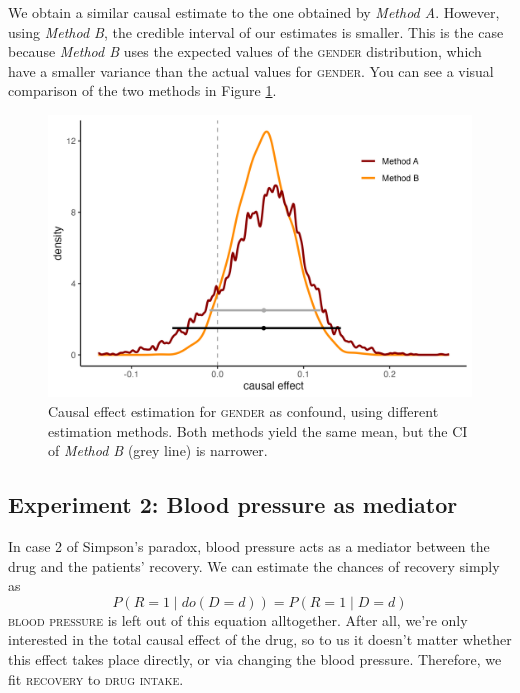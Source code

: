 \documentclass[nobib]{tufte-handout}
\newcommand{\mathdo}{\mathit{do}}
\begin{document}
We obtain a similar causal estimate to the one obtained by \emph{Method A}.
However, using \emph{Method B}, the credible interval of our estimates is smaller.
This is the case because \emph{Method B} uses the expected values of the \textsc{gender} distribution, which have a smaller variance than the actual values for \textsc{gender}.
You can see a visual comparison of the two methods in Figure \ref{fig:gender}.
\begin{figure}
    \centering
    \includegraphics[width=0.8\linewidth]{img/gender_estimation_comparison.png}
    \caption{Causal effect estimation for \textsc{gender} as confound, using different estimation methods. Both methods yield the same mean, but the CI of \emph{Method B} (grey line) is narrower.}
    \label{fig:gender}
\end{figure}


\subsection{Experiment 2: Blood pressure as mediator}
In case 2 of Simpson’s paradox, blood pressure acts as a mediator between the drug and the patients’ recovery. 
We can estimate the chances of recovery simply as
$$P\left(R=1\mid \mathdo(D=d)\right)=P\left(R=1\mid D=d\right)$$
\textsc{blood pressure} is left out of this equation alltogether. 
After all, we’re only interested in the total causal effect of the drug, so to us it doesn't matter whether this effect takes place directly, or via changing the blood pressure.
Therefore, we fit \textsc{recovery} to \textsc{drug intake}.
\end{document}
